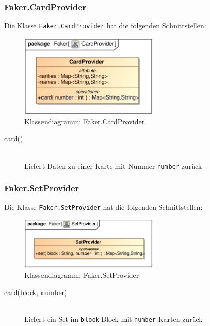 \subsubsection{Faker.CardProvider}
Die Klasse \verb|Faker.CardProvider| hat die folgenden Schnittstellen:
\begin{figure}[H]
    \myfloatalign
    \includegraphics[width=0.6\textwidth]{gfx/MtGDeepAnalysis/CardProvider.eps}
    \caption{Klassendiagramm: Faker.CardProvider}
    \label{fig:class:Faker.CardProvider}
\end{figure}
\begin{description}
    \item[card()] \hfill \\
    Liefert Daten zu einer Karte mit Nummer \verb|number| zurück
\end{description}

\subsubsection{Faker.SetProvider}
Die Klasse \verb|Faker.SetProvider| hat die folgenden Schnittstellen:
\begin{figure}[H]
    \myfloatalign
    \includegraphics[width=0.6\textwidth]{gfx/MtGDeepAnalysis/SetProvider.eps}
    \caption{Klassendiagramm: Faker.SetProvider}
    \label{fig:class:Faker.SetProvider}
\end{figure}
\begin{description}
    \item[card(block, number)] \hfill \\
    Liefert ein Set im \verb|block| Block mit \verb|number| Karten zurück
\end{description}


